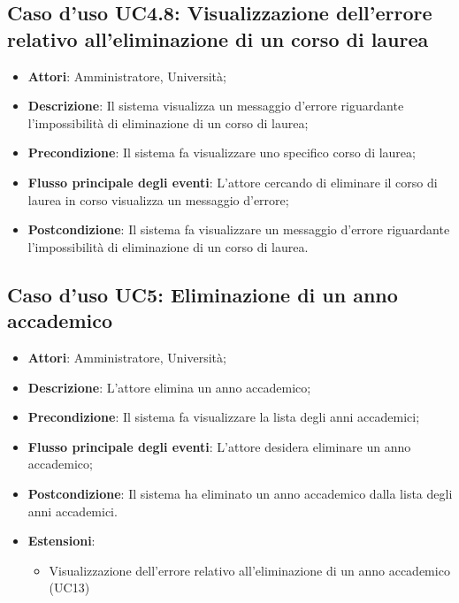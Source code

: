 \subsection{Caso d'uso \texorpdfstring{UC4.8}{UC4.8}: Visualizzazione dell'errore relativo all'eliminazione di un corso di laurea}
\begin{itemize}
\item \textbf{Attori}: Amministratore, Università;
\item \textbf{Descrizione}: Il sistema visualizza un messaggio d'errore riguardante l'impossibilità di eliminazione di un corso di laurea;

\item \textbf{Precondizione}: Il sistema fa visualizzare uno specifico corso di laurea;


\item \textbf{Flusso principale degli eventi}: L'attore cercando di eliminare il corso di laurea in corso visualizza un messaggio d'errore;

\item \textbf{Postcondizione}: Il sistema fa visualizzare un messaggio d'errore riguardante l'impossibilità di eliminazione di un corso di laurea.

\end{itemize}
\subsection{Caso d'uso \texorpdfstring{UC5}{UC5}: Eliminazione di un anno accademico}
\begin{itemize}
\item \textbf{Attori}: Amministratore, Università;
\item \textbf{Descrizione}: L'attore elimina un anno accademico;
\item \textbf{Precondizione}: Il sistema fa visualizzare la lista degli anni accademici;
\item \textbf{Flusso principale degli eventi}: L'attore desidera eliminare un anno accademico;
\item \textbf{Postcondizione}: Il sistema ha eliminato un anno accademico dalla lista degli anni accademici.

\item \textbf{Estensioni}:
\begin{itemize}
\item Visualizzazione dell'errore relativo all'eliminazione di un anno accademico (UC13)
\end{itemize}
\end{itemize}
